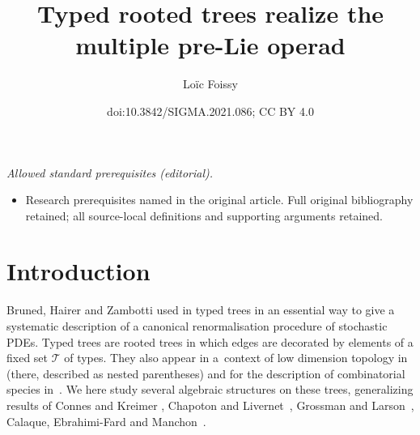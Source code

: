 \documentclass[10pt,a4paper]{amsart}
\title{Typed rooted trees realize the multiple pre-Lie operad}
\author{Loïc Foissy}
\date{doi:10.3842/SIGMA.2021.086; CC BY 4.0}
\numberwithin{equation}{section}
\newcommand{\T}{\mathcal{T}}
\begin{document}
\maketitle
\noindent\textit{Allowed standard prerequisites (editorial).}\begin{itemize}
\item Research prerequisites named in the original article. Full original bibliography retained; all source-local definitions and supporting arguments retained.
\end{itemize}\medskip
\section{Introduction}

Bruned, Hairer and Zambotti used in \cite{Bruned,Hairer} typed trees in an essential way
to give a systematic description of a canonical renormalisation procedure of
stochastic PDEs. Typed trees are rooted trees in which edges are decorated by elements of a fixed set $\T$ of types.
They also appear in a~context of low dimension topology in \cite{Mathar} (there, described as nested parentheses)
and for the description
of combinatorial species in~\cite{Bergeron}.
We here study several algebraic structures on these trees, generalizing results of Connes and Kreimer \cite{ConnesKreimer},
Chapoton and Livernet~\cite{ChapotonLivernet}, Grossman and Larson~\cite{GrossmanLarson},
Calaque, Ebrahimi-Fard and Manchon~\cite{Manchon}.
\end{document}
